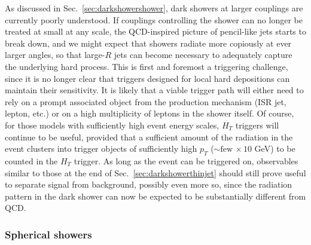 As discussed in Sec.~\ref{sec:darkshowershower}, dark showers at larger couplings are currently poorly understood. If couplings controlling the shower can no longer be treated at small at any scale, the QCD-inspired picture of pencil-like jets starts to break down, and we might expect that showers radiate more copiously at ever larger angles, so that large-$R$ jets can become necessary to adequately capture the underlying hard process. This is first and foremost a triggering challenge, since it is no longer clear that triggers designed for local hard depositions can maintain their sensitivity. It is likely that a viable trigger path will either need to rely on a prompt associated object from the production mechanism (ISR jet, lepton, etc.) or on a high multiplicity of leptons in the shower itself. Of course, for those models with sufficiently high event energy scales, $H_T$ triggers will continue to be useful, provided that a sufficient amount of the radiation in the event clusters into trigger objects of sufficiently high $p_T$ ($\sim\mathrm{few \,}\times 10$ GeV) to be counted in the $H_T$ trigger. As long as the event can be triggered on, observables similar to those at the end of Sec.~\ref{sec:darkshowerthinjet} should still prove useful to separate signal from background, possibly even more so, since the radiation pattern in the dark shower can now be expected to be substantially different from QCD.


\subsubsection{Spherical showers} %

